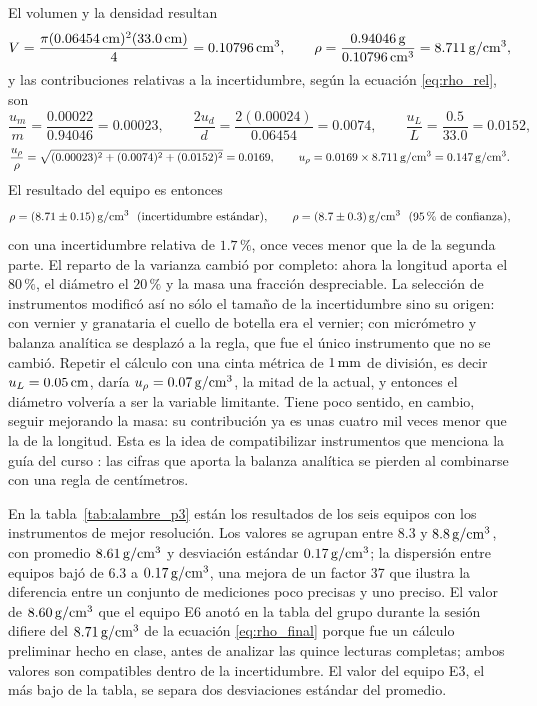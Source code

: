 El volumen y la densidad resultan
\begin{equation*}
    V = \frac{\pi (0.06454\,\mathrm{cm})^{2}(33.0\,\mathrm{cm})}{4} = 0.10796\,\mathrm{cm^{3}}, \qquad
    \rho = \frac{0.94046\,\mathrm{g}}{0.10796\,\mathrm{cm^{3}}} = 8.711\,\mathrm{g/cm^{3}},
\end{equation*}
y las contribuciones relativas a la incertidumbre, según la ecuación \eqref{eq:rho_rel}, son
\begin{equation*}
    \frac{u_m}{m} = \frac{0.00022}{0.94046} = 0.00023, \qquad
    \frac{2u_d}{d} = \frac{2(0.00024)}{0.06454} = 0.0074, \qquad
    \frac{u_L}{L} = \frac{0.5}{33.0} = 0.0152,
\end{equation*}
\begin{equation*}
    \frac{u_\rho}{\rho} = \sqrt{(0.00023)^{2} + (0.0074)^{2} + (0.0152)^{2}} = 0.0169, \qquad u_\rho = 0.0169 \times 8.711\,\mathrm{g/cm^{3}} = 0.147\,\mathrm{g/cm^{3}}.
\end{equation*}
El resultado del equipo es entonces
\begin{equation}
    \rho = (8.71 \pm 0.15)\,\mathrm{g/cm^{3}} \ \ (\text{incertidumbre estándar}), \qquad
    \rho = (8.7 \pm 0.3)\,\mathrm{g/cm^{3}} \ \ (95\,\%\ \text{de confianza}),
    \label{eq:rho_final}
\end{equation}
con una incertidumbre relativa de $1.7\,\%$, once veces menor que la de la segunda parte. El reparto de la varianza cambió por completo: ahora la longitud aporta el $80\,\%$, el diámetro el $20\,\%$ y la masa una fracción despreciable. La selección de instrumentos modificó así no sólo el tamaño de la incertidumbre sino su origen: con vernier y granataria el cuello de botella era el vernier; con micrómetro y balanza analítica se desplazó a la regla, que fue el único instrumento que no se cambió. Repetir el cálculo con una cinta métrica de $1\,\mathrm{mm}$ de división, es decir $u_L = 0.05\,\mathrm{cm}$, daría $u_\rho = 0.07\,\mathrm{g/cm^{3}}$, la mitad de la actual, y entonces el diámetro volvería a ser la variable limitante. Tiene poco sentido, en cambio, seguir mejorando la masa: su contribución ya es unas cuatro mil veces menor que la de la longitud. Esta es la idea de compatibilizar instrumentos que menciona la guía del curso \cite{guia}: las cifras que aporta la balanza analítica se pierden al combinarse con una regla de centímetros.

En la tabla~\ref{tab:alambre_p3} están los resultados de los seis equipos con los instrumentos de mejor resolución. Los valores se agrupan entre $8.3$ y $8.8\,\mathrm{g/cm^{3}}$, con promedio $8.61\,\mathrm{g/cm^{3}}$ y desviación estándar $0.17\,\mathrm{g/cm^{3}}$; la dispersión entre equipos bajó de $6.3$ a $0.17\,\mathrm{g/cm^{3}}$, una mejora de un factor 37 que ilustra la diferencia entre un conjunto de mediciones poco precisas y uno preciso. El valor de $8.60\,\mathrm{g/cm^{3}}$ que el equipo E6 anotó en la tabla del grupo durante la sesión difiere del $8.71\,\mathrm{g/cm^{3}}$ de la ecuación \eqref{eq:rho_final} porque fue un cálculo preliminar hecho en clase, antes de analizar las quince lecturas completas; ambos valores son compatibles dentro de la incertidumbre. El valor del equipo E3, el más bajo de la tabla, se separa dos desviaciones estándar del promedio.

